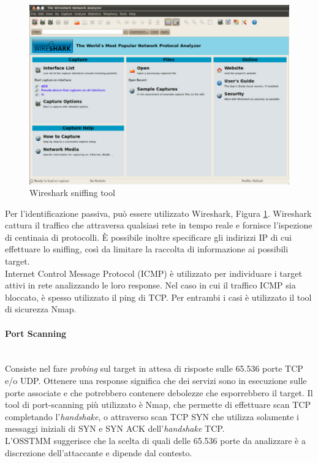 \begin{figure}[hbtp]
	\centering
	\includegraphics[scale=.3]{imgs/attack/wireshark.png}
	\caption{Wireshark sniffing tool}
	\label{wireshark_img}
\end{figure}

Per l'identificazione passiva, può essere utilizzato Wireshark, Figura \ref{wireshark_img}.\cite{wireshark} Wireshark cattura il traffico che attraversa qualsiasi rete in tempo reale e fornisce l'ispezione di centinaia di protocolli. È possibile inoltre specificare gli indirizzi IP di cui effettuare lo sniffing, così da limitare la raccolta di informazione ai possibili target.\\
Internet Control Message Protocol (ICMP) è utilizzato per individuare i target attivi in rete analizzando le loro response. Nel caso in cui il traffico ICMP sia bloccato, è spesso utilizzato il ping di TCP. Per entrambi i casi è utilizzato il tool di sicurezza Nmap\cite{nmap}.

\paragraph{Port Scanning}\mbox{}\\
Consiste nel fare \emph{probing} sul target in attesa di risposte sulle 65.536 porte TCP e/o UDP. Ottenere una response significa che dei servizi sono in esecuzione sulle porte associate e che potrebbero contenere debolezze che esporrebbero il target. Il tool di port-scanning più utilizzato è Nmap, che permette di effettuare scan TCP completando l'\emph{handshake}, o attraverso scan TCP SYN che utilizza solamente i messaggi iniziali di SYN e SYN ACK dell'\emph{handshake} TCP.\\
L'OSSTMM suggerisce che la scelta di quali delle 65.536 porte da analizzare è a discrezione dell'attaccante e dipende dal contesto.

